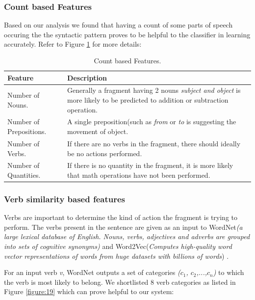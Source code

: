 \documentclass[11pt]{article}
\begin{document}
\subsubsection{Count based Features}\label{sec:featurescountbased}
Based on our analysis we found that having a count of some parts of speech occuring the the syntactic pattern proves to be helpful to the classifier in learning accurately. Refer to Figure \ref{figure:18} for more details:

\begin{table}[h!]
\centering
\begin{tabular}{ | m{5em} | m{25em} |}
\hline
\textbf{Feature} & \textbf{Description} \\
\hline
 Number of Nouns. & Generally a fragment having 2 nouns \textit{subject and object} is more likely to be predicted to addition or subtraction operation.\\
\hline
Number of Prepositions. & A single preposition(such as \textit{from} or \textit{to} is suggesting the movement of object.\\
\hline
Number of Verbs. & If there are no verbs in the fragment, there should ideally be no actions performed.\\
\hline
Number of Quantities. & If there is no quantity in the fragment, it is more likely that math operations have not been performed.\\
\hline
\end{tabular}
\caption{Count based Features.}
\label{figure:18}
\end{table}

\subsubsection{Verb similarity based features}\label{sec:featuressimilaritybased}
Verbs are important to determine the kind of action the fragment is trying to perform. The verbs present in the sentence are given as an input to WordNet\textit{(a large lexical database of English. Nouns, verbs, adjectives and adverbs are grouped into sets of cognitive synonyms)} \citep{WordNet} and Word2Vec(\textit{Computes high-quality word vector representations of words from huge datasets with billions of words}) \citep{Word2Vec}. 

For an input verb \textit{v}, WordNet outputs a set of categories \textit{($c_{1}$, $c_{2}$,...,$c_{n}$)} to which the verb is most likely to belong. We shortlisted 8 verb categories as listed in Figure \ref{figure:19} which can prove helpful to our system:
\end{document}
